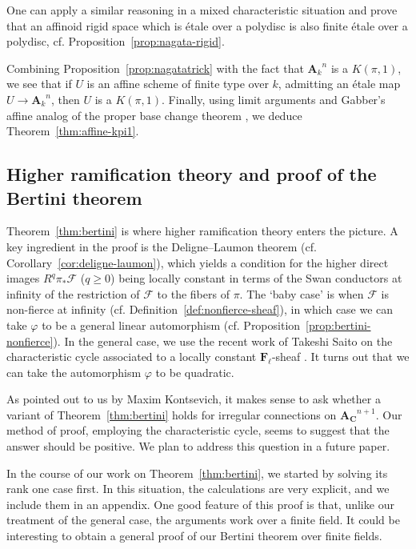 \documentclass[twoside]{amsart}
\renewcommand{\AA}{\mathbf{A}}
\newcommand{\CC}{\mathbf{C}}
\newcommand{\FF}{\mathbf{F}}
\newcommand{\Ff}{\mathscr{F}}
\newcommand{\ANK}[2]{{\AA_{#2}}^{\! \! \! \!  #1}} %
\newcommand{\AN}[1]{\ANK{#1}{k}}
\renewcommand{\phi}{\varphi}
\renewcommand{\to}{\longrightarrow}
\theoremstyle{plain}
\theoremstyle{definition}
\theoremstyle{remark}
\numberwithin{equation}{subsection}
\begin{document}
One can apply a similar reasoning in a mixed characteristic situation and prove that an affinoid rigid space which is \'etale over a polydisc is also finite \'etale over a polydisc, cf. Proposition~\ref{prop:nagata-rigid}.

Combining Proposition~\ref{prop:nagatatrick} with the fact that $\AN n$ is a $K(\pi, 1)$, we see that if $U$ is an affine scheme of finite type over $k$, admitting an \'etale map $U\to \AN n$, then $U$ is a $K(\pi, 1)$. Finally, using limit arguments and Gabber's affine analog of the proper base change theorem \cite{Gabber}, we deduce Theorem~\ref{thm:affine-kpi1}.

\subsection{Higher ramification theory and proof of the Bertini theorem}

Theorem~\ref{thm:bertini} is where higher ramification theory enters the picture. A key ingredient in the proof is the Deligne--Laumon theorem (cf. Corollary~\ref{cor:deligne-laumon}), which yields a condition for the higher direct images $R^q \pi_* \Ff$ ($q\geq 0$) being locally constant in terms of the Swan conductors at infinity of the restriction of $\Ff$ to the fibers of $\pi$. The `baby case' is when $\Ff$ is non-fierce at infinity (cf. Definition~\ref{def:nonfierce-sheaf}), in which case we can take $\phi$ to be a general linear automorphism (cf. Proposition~\ref{prop:bertini-nonfierce}). In the general case, we use the recent work of Takeshi Saito on the characteristic cycle associated to a locally constant $\FF_\ell$-sheaf \cite{Saito,Saito2016}. It turns out that we can take the automorphism $\phi$ to be quadratic. %

As pointed out to us by Maxim Kontsevich, it makes sense to ask whether a variant of Theorem~\ref{thm:bertini} holds for irregular connections on $\ANK{n+1}{\CC}$. Our method of proof, employing the characteristic cycle, seems to suggest that the answer should be positive. We plan to address this question in a future paper.

In the course of our work on Theorem~\ref{thm:bertini}, we started by solving its rank one case first. In this situation, the calculations are very explicit, and we include them in an appendix. One good feature of this proof is that, unlike our treatment of the general case, the arguments work over a finite field. It could be interesting to obtain a general proof of our Bertini theorem over finite fields.
\end{document}
